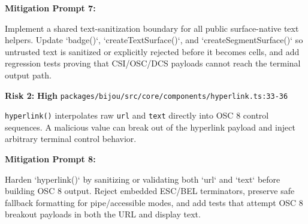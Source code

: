 \textbf{Mitigation Prompt 7:}

\begin{CodeBlock}
Implement a shared text-sanitization boundary for all public surface-native text helpers. Update `badge()`, `createTextSurface()`, and `createSegmentSurface()` so untrusted text is sanitized or explicitly rejected before it becomes cells, and add regression tests proving that CSI/OSC/DCS payloads cannot reach the terminal output path.
\end{CodeBlock}

\textbf{Risk 2:} \textbf{High} \textbar{} \texttt{p\allowbreak{}a\allowbreak{}c\allowbreak{}k\allowbreak{}a\allowbreak{}g\allowbreak{}e\allowbreak{}s\allowbreak{}/\allowbreak{}b\allowbreak{}i\allowbreak{}j\allowbreak{}o\allowbreak{}u\allowbreak{}/\allowbreak{}s\allowbreak{}r\allowbreak{}c\allowbreak{}/\allowbreak{}c\allowbreak{}o\allowbreak{}r\allowbreak{}e\allowbreak{}/\allowbreak{}c\allowbreak{}o\allowbreak{}m\allowbreak{}p\allowbreak{}o\allowbreak{}n\allowbreak{}e\allowbreak{}n\allowbreak{}t\allowbreak{}s\allowbreak{}/\allowbreak{}h\allowbreak{}y\allowbreak{}p\allowbreak{}e\allowbreak{}r\allowbreak{}l\allowbreak{}i\allowbreak{}n\allowbreak{}k\allowbreak{}.\allowbreak{}t\allowbreak{}s\allowbreak{}:\allowbreak{}3\allowbreak{}3\allowbreak{}-\allowbreak{}3\allowbreak{}6}

\texttt{h\allowbreak{}y\allowbreak{}p\allowbreak{}e\allowbreak{}r\allowbreak{}l\allowbreak{}i\allowbreak{}n\allowbreak{}k\allowbreak{}(\allowbreak{})} interpolates raw \texttt{u\allowbreak{}r\allowbreak{}l} and \texttt{t\allowbreak{}e\allowbreak{}x\allowbreak{}t} directly into OSC 8 control sequences. A malicious value can break out of the hyperlink payload and inject arbitrary terminal control behavior.

\textbf{Mitigation Prompt 8:}

\begin{CodeBlock}
Harden `hyperlink()` by sanitizing or validating both `url` and `text` before building OSC 8 output. Reject embedded ESC/BEL terminators, preserve safe fallback formatting for pipe/accessible modes, and add tests that attempt OSC 8 breakout payloads in both the URL and display text.
\end{CodeBlock}

